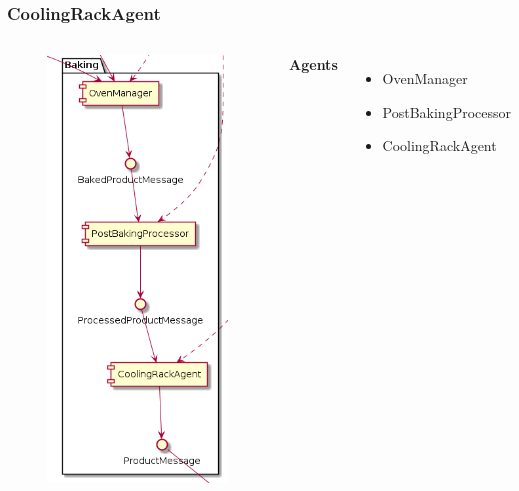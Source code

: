 \documentclass{beamer}
\begin{document}
\begin{frame}
    \frametitle{\huge{CoolingRackAgent}}
    \begin{columns}[t]
        \begin{figure}[H]
            \centering
            \includegraphics[width=0.6\linewidth]{baking_component_diagram.png}
        \end{figure}
            \textbf{Agents}
            \begin{itemize}
                \item OvenManager
                \item PostBakingProcessor
                \item CoolingRackAgent
            \end{itemize}
    \end{columns}
\end{frame}
\end{document}
